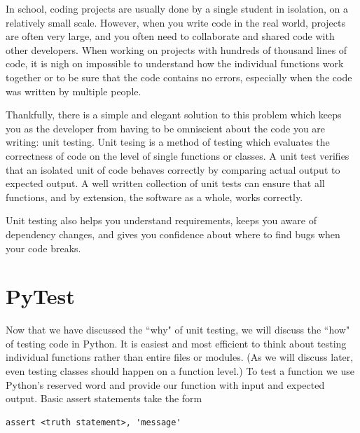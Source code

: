 


In school, coding projects are usually done by a single student in isolation, on a relatively small scale.  However, when you write code in the real world, projects are often very large, and you often need to collaborate and shared code with other developers.
When working on projects with hundreds of thousand lines of code, it is nigh on impossible to understand how the individual functions work together or to be sure that the code contains no errors, especially when the code was written by multiple people.

Thankfully, there is a simple and elegant solution to this problem which keeps you as the developer from having to be omniscient about the code you are writing: unit testing.
Unit tesing is a method of testing which evaluates the correctness of code on the level of single functions or classes. A unit test verifies that an isolated unit of code behaves correctly by comparing actual output to expected output. A well written collection of unit tests can ensure that all functions, and by extension, the software as a whole, works correctly.

Unit testing also helps you understand requirements, keeps you aware of dependency changes, and gives you confidence about where to find bugs when your code breaks.


\section*{PyTest}

Now that we have discussed the ``why" of unit testing, we will discuss the ``how" of testing code in Python.
It is easiest and most efficient to think about testing individual functions rather than entire files or modules.
(As we will discuss later, even testing classes should happen on a function level.)
To test a function we use Python's reserved word  and provide our function with input and expected output. Basic assert statements take the form\\

\begin{lstlisting}
assert <truth statement>, 'message'
\end{lstlisting}

